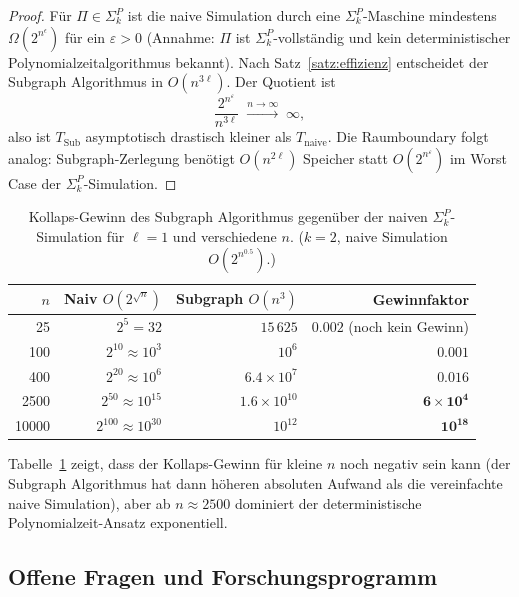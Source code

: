 ﻿\documentclass[a4paper,12pt]{article}
\theoremstyle{definition}
\begin{document}
\begin{proof}
  Für $\Pi \in \Sigma_k^P$ ist die naive Simulation durch eine $\Sigma_k^P$-Maschine
  mindestens $\Omega(2^{n^\epsilon})$ für ein $\varepsilon > 0$
  (Annahme: $\Pi$ ist $\Sigma_k^P$-vollständig und kein deterministischer
  Polynomialzeitalgorithmus bekannt).
  Nach Satz~\ref{satz:effizienz} entscheidet der Subgraph Algorithmus in $O(n^{3\ell})$.
  Der Quotient ist
  \[
    \frac{2^{n^\varepsilon}}{n^{3\ell}} \;\xrightarrow{n \to \infty}\; \infty,
  \]
  also ist $T_\mathrm{Sub}$ asymptotisch drastisch kleiner als $T_\mathrm{naive}$.
  Die Raumboundary folgt analog: Subgraph-Zerlegung benötigt $O(n^{2\ell})$ Speicher
  statt $O(2^{n^\varepsilon})$ im Worst Case der $\Sigma_k^P$-Simulation.
\end{proof}

\begin{table}[htbp]
  \centering
  \caption{Kollaps-Gewinn des Subgraph Algorithmus gegenüber der naiven $\Sigma_k^P$-Simulation
    für $\ell = 1$ und verschiedene $n$. ($k = 2$, naive Simulation $O(2^{n^{0.5}})$.)}
  \label{tab:kollaps}
  \begin{tabular}{r r r r}
    \toprule
    $n$ & Naiv $O(2^{\sqrt{n}})$ & Subgraph $O(n^3)$ & Gewinnfaktor \\
    \midrule
    25  & $2^5 = 32$              & $15\,625$         & $0.002$ (noch kein Gewinn) \\
    100 & $2^{10} \approx 10^3$   & $10^6$            & $0.001$ \\
    400 & $2^{20} \approx 10^6$   & $6.4 \times 10^7$ & $0.016$ \\
    2500& $2^{50} \approx 10^{15}$& $1.6 \times 10^{10}$ & $\mathbf{6 \times 10^4}$ \\
    10000& $2^{100} \approx 10^{30}$ & $10^{12}$ & $\mathbf{10^{18}}$ \\
    \bottomrule
  \end{tabular}
\end{table}

Tabelle~\ref{tab:kollaps} zeigt, dass der Kollaps-Gewinn für kleine $n$ noch
negativ sein kann (der Subgraph Algorithmus hat dann höheren absoluten Aufwand
als die vereinfachte naive Simulation), aber ab $n \approx 2500$ dominiert
der deterministische Polynomialzeit-Ansatz exponentiell.

\subsection{Offene Fragen und Forschungsprogramm}
\end{document}
